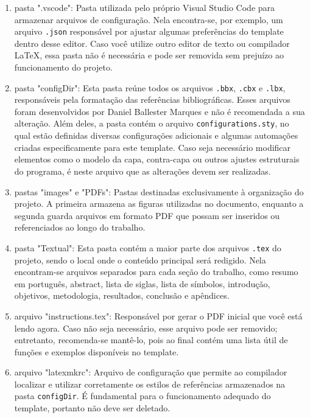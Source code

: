 \begin{enumerate} 

\item pasta ".vscode": Pasta utilizada pelo próprio Visual Studio Code para armazenar arquivos de configuração. Nela encontra-se, por exemplo, um arquivo \texttt{.json} responsável por ajustar algumas preferências do template dentro desse editor. Caso você utilize outro editor de texto ou compilador \LaTeX, essa pasta não é necessária e pode ser removida sem prejuízo ao funcionamento do projeto.

\item pasta "configDir": Esta pasta reúne todos os arquivos \texttt{.bbx}, \texttt{.cbx} e \texttt{.lbx}, responsáveis pela formatação das referências bibliográficas. Esses arquivos foram desenvolvidos por Daniel Ballester Marques e não é recomendada a sua alteração. Além deles, a pasta contém o arquivo \texttt{configurations.sty}, no qual estão definidas diversas configurações adicionais e algumas automações criadas especificamente para este template. Caso seja necessário modificar elementos como o modelo da capa, contra-capa ou outros ajustes estruturais do programa, é neste arquivo que as alterações devem ser realizadas.

\item pastas "images" e "PDFs": Pastas destinadas exclusivamente à organização do projeto. A primeira armazena as figuras utilizadas no documento, enquanto a segunda guarda arquivos em formato PDF que possam ser inseridos ou referenciados ao longo do trabalho.

\item pasta "Textual": Esta pasta contém a maior parte dos arquivos \texttt{.tex} do projeto, sendo o local onde o conteúdo principal será redigido. Nela encontram-se arquivos separados para cada seção do trabalho, como resumo em português, abstract, lista de siglas, lista de símbolos, introdução, objetivos, metodologia, resultados, conclusão e apêndices.

\item arquivo "instructions.tex": Responsável por gerar o PDF inicial que você está lendo agora. Caso não seja necessário, esse arquivo pode ser removido; entretanto, recomenda-se mantê-lo, pois ao final contém uma lista útil de funções e exemplos disponíveis no template.

\item arquivo "latexmkrc": Arquivo de configuração que permite ao compilador localizar e utilizar corretamente os estilos de referências armazenados na pasta \texttt{configDir}. É fundamental para o funcionamento adequado do template, portanto não deve ser deletado.


\end{enumerate}
